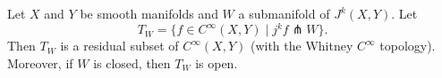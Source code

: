 Let $X$ and $Y$ be smooth manifolds and $W$ a submanifold of $J^k(X, Y)$. Let
$$T_W = \{f \in C^\infty(X, Y) \mid j^k f \pitchfork W\}.$$
Then $T_W$ is a residual subset of $C^\infty(X, Y)$ (with the Whitney $C^\infty$ topology). Moreover, if $W$ is closed, then $T_W$ is open.